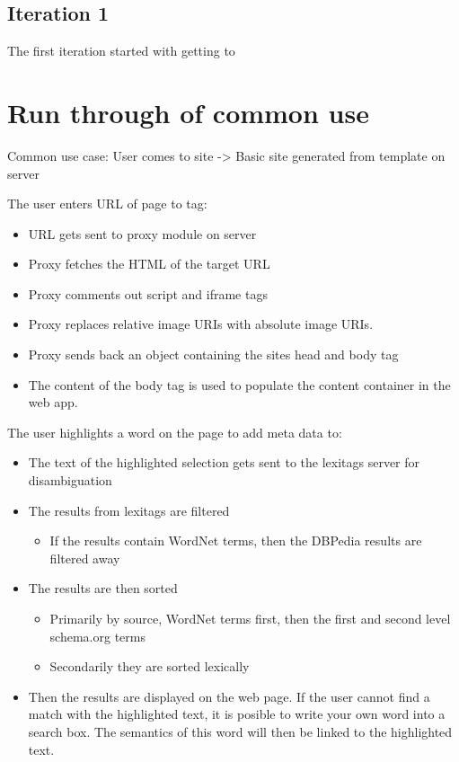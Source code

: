 \subsection{Iteration 1}
The first iteration started with getting to


\section{Run through of common use}
Common use case:
User comes to site -> Basic site generated from template on server

The user enters URL of page to tag:
\begin{itemize}
	\item URL gets sent to proxy module on server
	\item Proxy fetches the HTML of the target URL
	\item Proxy comments out script and iframe tags
	\item Proxy replaces relative image URIs with absolute image URIs.
	\item Proxy sends back an object containing the sites head and body tag
	\item The content of the body tag is used to populate the content container in the web app.
\end{itemize}
The user highlights a word on the page to add meta data to:
\begin{itemize}
	\item The text of the highlighted selection gets sent to the lexitags server for disambiguation
	\item The results from lexitags are filtered
	\begin{itemize}
		\item If the results contain WordNet terms, then the DBPedia results are filtered away
	\end{itemize}
	\item The results are then sorted
	\begin{itemize}
		\item Primarily by source, WordNet terms first, then the first and second level schema.org terms
		\item Secondarily they are sorted lexically
	\end{itemize}
	\item Then the results are displayed on the web page. If the user cannot find a match with the highlighted text,
	it is posible to write your own word into a search box.
	The semantics of this word will then be linked to the highlighted text.
\end{itemize}
